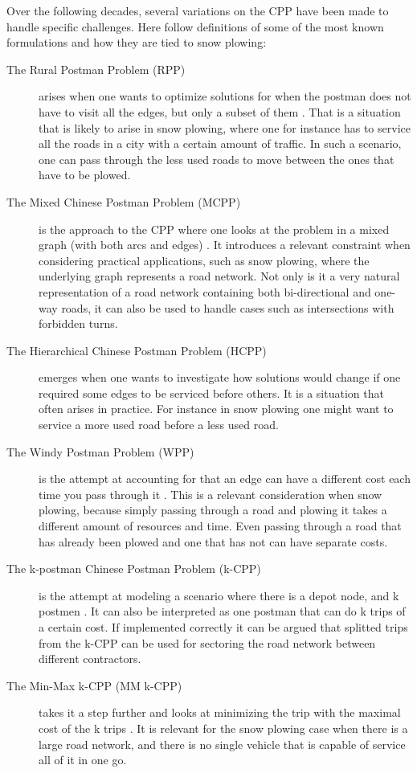 Over the following decades, several variations on the CPP have been made to handle specific challenges. Here follow definitions of some of the most known formulations and how they are tied to snow plowing:

\begin{description}

\item [The Rural Postman Problem (RPP)] arises when one wants to optimize solutions for when the postman does not have to visit all the edges, but only a subset of them \citep{pearn1995RPP}. That is a situation that is likely to arise in snow plowing, where one for instance has to service all the roads in a city with a certain amount of traffic. In such a scenario, one can pass through the less used roads to move between the ones that have to be plowed.

\item [The Mixed Chinese Postman Problem (MCPP)] is the approach to the CPP where one looks at the problem in a mixed graph (with both arcs and edges) \citep{pearn1995mixedCPP}. It introduces a relevant constraint when considering practical applications, such as snow plowing, where the underlying graph represents a road network. Not only is it a very natural representation of a road network containing both bi-directional and one-way roads, it can also be used to handle cases such as intersections with forbidden turns.

\item [The Hierarchical Chinese Postman Problem (HCPP)] \citep{ghiani2000HCPP} emerges when one wants to investigate how solutions would change if one required some edges to be serviced before others. It is a situation that often arises in practice. For instance in snow plowing one might want to service a more used road before a less used road.

\item [The Windy Postman Problem (WPP)] is the attempt at accounting for that an edge can have a different cost each time you pass through it \citep{dussault2013WPP}. This is a relevant consideration when snow plowing, because simply passing through a road and plowing it takes a different amount of resources and time. Even passing through a road that has already been plowed and one that has not can have separate costs.

\item [The k-postman Chinese Postman Problem (k-CPP)] is the attempt at modeling a scenario where there is a depot node, and k postmen \citep{edmonds1973kCPP}. It can also be interpreted as one postman that can do k trips of a certain cost. If implemented correctly it can be argued that splitted trips from the k-CPP can be used for sectoring the road network between different contractors.

\item[The Min-Max k-CPP (MM k-CPP)] takes it a step further and looks at minimizing the trip with the maximal cost of the k trips \citep{frederickson1976MMkCPP}. It is relevant for the snow plowing case when there is a large road network, and there is no single vehicle that is capable of service all of it in one go. 

\end{description}


